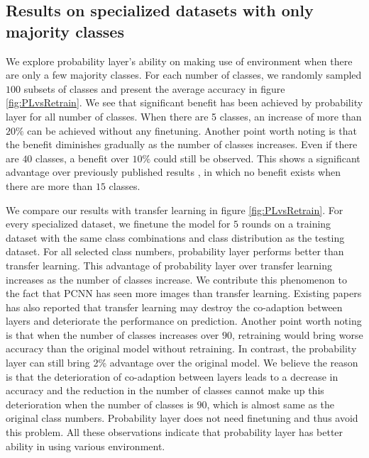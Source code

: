 \documentclass[pageno]{jpaper}
\begin{document}
\subsection{Results on specialized datasets with only majority classes}

We explore probability layer's ability on making use of environment when there are only a few majority classes. For each number of classes, we randomly sampled $100$ subsets of classes and present the average accuracy in figure \ref{fig:PLvsRetrain}. We see that significant benefit has been achieved by probability layer for all number of classes. When there are 5 classes, an increase of more than $20\%$ can be achieved without any finetuning. Another point worth noting is that the benefit diminishes gradually as the number of classes increases. Even if there are $40$ classes, a benefit over $10\%$ could still be observed. This shows a significant advantage over previously published results \cite{shen2016fast}, in which no benefit exists when there are more than $15$ classes.
 
We compare our results with transfer learning in figure \ref{fig:PLvsRetrain}. For every specialized dataset, we finetune the model for $5$ rounds on a training dataset with the same class combinations and class distribution as the testing dataset. For all selected class numbers, probability layer performs better than transfer learning. This advantage of probability layer over transfer learning increases as the number of classes increase. We contribute this phenomenon to the fact that PCNN has seen more images than transfer learning. Existing papers \cite{yosinski2014transferable} has also reported that transfer learning may destroy the co-adaption between layers and deteriorate the performance on prediction. Another point worth noting is that when the number of classes increases over $90$, retraining would bring worse accuracy than the original model without retraining. In contrast, the probability layer can still bring 2\% advantage over the original model. We believe the reason is that the deterioration of co-adaption between layers leads to a decrease in accuracy and the reduction in the number of classes cannot make up this deterioration when the number of classes is $90$, which is almost same as the original class numbers. Probability layer does not need finetuning and thus avoid this problem. All these observations indicate that probability layer has better ability in using various environment.
\end{document}
